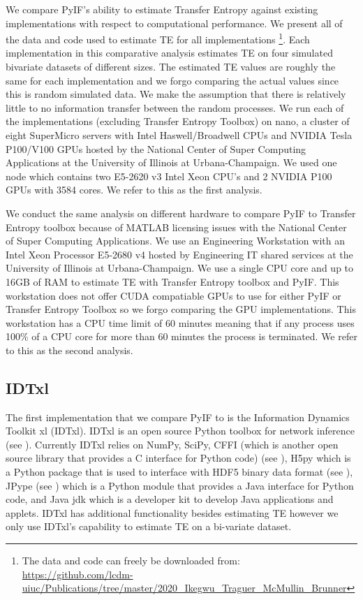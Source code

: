 We compare PyIF's ability to estimate Transfer Entropy against existing implementations with respect to computational performance. We present all of the data and code used to estimate TE for all implementations \footnote{The data and code can freely be downloaded from: \\  \url{https://github.com/lcdm-uiuc/Publications/tree/master/2020\_Ikegwu\_Traguer\_McMullin\_Brunner}}. Each implementation in this comparative analysis estimates TE on four simulated bivariate datasets of different sizes. The estimated TE values are roughly the same for each implementation and we forgo comparing the actual values since this is random simulated data. We make the assumption that there is relatively little to no information transfer between the random processes. We run each of the implementations (excluding Transfer Entropy Toolbox)  on nano, a cluster of eight SuperMicro servers with Intel Haswell/Broadwell CPUs and NVIDIA Tesla P100/V100 GPUs hosted by the National Center of Super Computing Applications at the University of Illinois at Urbana-Champaign. We used one node which contains two E5-2620 v3 Intel Xeon CPU's and 2 NVIDIA P100 GPUs with 3584 cores.  We refer to this as the first analysis.

We conduct the same analysis on different hardware to compare PyIF to Transfer Entropy toolbox because of MATLAB licensing issues with the National Center of Super Computing Applications. We use an Engineering Workstation with an Intel Xeon Processor E5-2680 v4  hosted by Engineering IT shared services at the University of Illinois at Urbana-Champaign. We use a single CPU core and up to 16GB of RAM to estimate TE with Transfer Entropy toolbox and PyIF. This workstation does not offer CUDA compatiable GPUs to use for either PyIF or Transfer Entropy Toolbox so we forgo comparing the GPU implementations. This workstation has a CPU time limit of 60 minutes meaning that if any process uses 100\% of a CPU core for more than 60 minutes the process is terminated. We refer to this as the second analysis.

\subsection{IDTxl}
The first implementation that we compare PyIF to is the Information Dynamics Toolkit xl (IDTxl). IDTxl is an open source Python toolbox for network inference (see \cite{IDTxl}). Currently IDTxl relies on NumPy,  SciPy, CFFI (which is another open source library that provides a C interface for Python code) (see \cite{cffi}),  H5py which is a Python package that is used to interface with HDF5 binary data format (see \cite{hdf5}),  JPype (see \cite{jpype}) which is a Python module that provides a Java interface for Python code, and Java jdk which is a developer kit to develop Java applications and applets.  IDTxl has additional functionality besides estimating TE however we only use IDTxl's capability to estimate TE on a bi-variate dataset.


